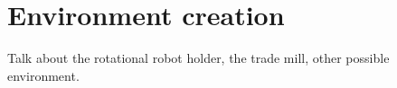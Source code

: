 \section{Environment creation} %
\label{sec:environment_creation}
Talk about the rotational robot holder, the trade mill, other possible environment.

